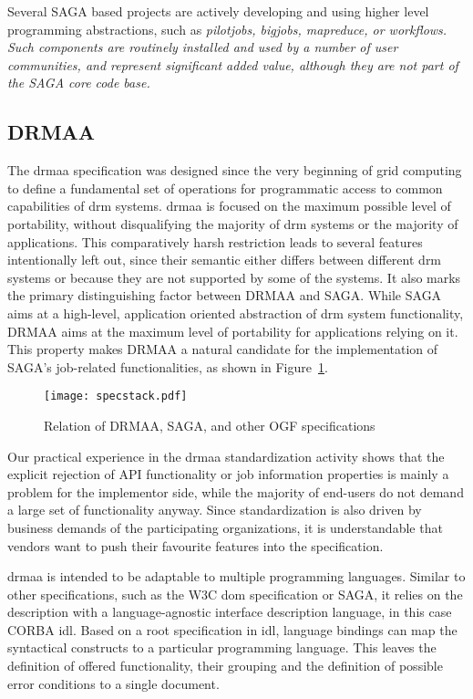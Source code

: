 \documentclass[twocolumn]{svjour3}       %
\begin{document}
Several SAGA based projects are actively developing and using higher level programming abstractions, such as \it{pilotjobs}, \it{bigjobs}, \it{mapreduce}, or workflows.  Such components are routinely installed and used by a number of user communities, and represent significant added value, although they are not part of the SAGA core code base. 

\subsection{DRMAA}
\label{sec:drmaa}

The \gls{drmaa} specification was designed since the very beginning of grid computing to define a fundamental set of operations for programmatic access to common capabilities of \gls{drm} systems. \gls{drmaa} is focused on the maximum possible level of portability, without disqualifying the majority of \gls{drm} systems or the majority of applications. This comparatively harsh restriction leads to several features intentionally left out, since their semantic either differs between different \gls{drm} systems or because they are not supported by some of the systems. It also marks the primary distinguishing factor between DRMAA and SAGA. While SAGA aims at a high-level, application oriented abstraction of \gls{drm} system functionality, DRMAA aims at the maximum level of portability for applications relying on it. This property makes DRMAA a natural candidate for the implementation of SAGA's job-related functionalities, as shown in Figure~\ref{fig:specstack}. 

\begin{figure}
  \texttt{[image: specstack.pdf]}
\caption{Relation of DRMAA, SAGA, and other OGF specifications}
\label{fig:specstack} 
\end{figure}


Our practical experience in the \gls{drmaa} standardization activity shows that the explicit rejection of API functionality or job information properties is mainly a problem for the implementor side, while the majority of end-users do not demand a large set of functionality anyway. Since standardization is also driven by business demands of the participating organizations, it is understandable that vendors want to push their favourite features into the specification.

\gls{drmaa} is intended to be adaptable to multiple programming languages. Similar to other specifications, such as the W3C \gls{dom} specification or SAGA, it relies on the description with a language-agnostic interface description language, in this case CORBA \gls{idl}. Based on a root specification in \gls{idl}, language bindings can map the syntactical constructs to a particular programming language. This leaves the definition of offered functionality, their grouping and the definition of possible error conditions to a single document.
\end{document}
